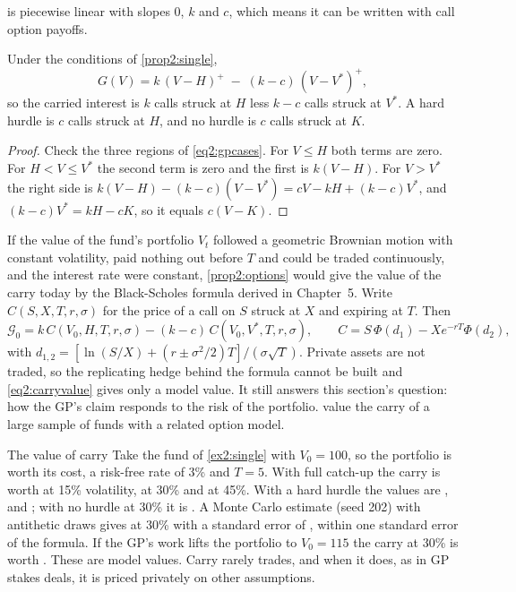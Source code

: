 \begin{chapterrefs}
 is piecewise linear with slopes $0$, $k$ and $c$, which means it can be written with
call option payoffs.

\begin{proposition}\label{prop2:options}
Under the conditions of \cref{prop2:single},
\begin{equation}\label{eq2:decomp}
  G(V) = k\,(V-H)^{+} \;-\; (k-c)\,(V-V^{*})^{+},
\end{equation}
so the carried interest is $k$ calls struck at $H$ less $k-c$ calls struck at $V^{*}$. A hard hurdle is
$c$ calls struck at $H$, and no hurdle is $c$ calls struck at $K$.
\end{proposition}
\begin{proof}
Check the three regions of \cref{eq2:gpcases}. For $V \le H$ both terms are zero. For $H < V \le V^*$ the
second term is zero and the first is $k(V-H)$. For $V > V^*$ the right side is
$k(V-H) - (k-c)(V-V^*) = cV - kH + (k-c)V^*$, and $(k-c)V^* = kH - cK$, so it equals $c(V-K)$.
\end{proof}

If the value of the fund's portfolio $V_t$ followed a geometric Brownian motion with constant
volatility, paid nothing out before $T$ and could be traded continuously, and the interest rate were
constant, \cref{prop2:options} would give the value of the carry today by the Black-Scholes formula
derived in Chapter~5. Write $C(S,X,T,r,\sigma)$ for the price of a call on $S$ struck at $X$ and expiring at $T$.
Then
\begin{equation}\label{eq2:carryvalue}
  \mathcal{G}_0 = k\,C(V_0, H, T, r, \sigma) - (k-c)\,C(V_0, V^{*}, T, r, \sigma),
  \qquad C = S\,\Phi(d_1) - X e^{-rT}\Phi(d_2),
\end{equation}
with $d_{1,2} = [\ln(S/X) + (r \pm \sigma^2/2)T]/(\sigma\sqrt T)$. Private assets are not traded, so the replicating hedge behind the formula cannot be
built and \cref{eq2:carryvalue} gives only a model value. It still answers this section's question: how
the GP's claim responds to the risk of the portfolio.
\textcite{metrick2010} value the carry of a large sample of funds with a related option model.

\begin{example}{The value of carry}\label{ex2:carryvalue}
Take the fund of \cref{ex2:single} with $V_0 = 100$, so the portfolio is worth its cost, a risk-free
rate of 3\% and $T = 5$. With full catch-up the carry is worth \carryFullFifteen{} at 15\% volatility,
\carryFullThirty{} at 30\% and \carryFullFortyFive{} at 45\%. With a hard hurdle the values are
\carryHardFifteen, \carryHardThirty{} and \carryHardFortyFive; with no hurdle at 30\% it is
\carryNoHurdleThirty. A Monte Carlo estimate (seed 202) with \carryMCn{} antithetic draws gives \carryMCThirty{} at
30\% with a standard error of \carryMCse, within one standard error of the formula. If the GP's work
lifts the portfolio to $V_0 = 115$ the carry at 30\% is worth \carryFullThirtyRich. These are model values. Carry rarely trades, and when it does, as in
GP stakes deals, it is priced privately on other assumptions.
\end{example}


\end{chapterrefs}
